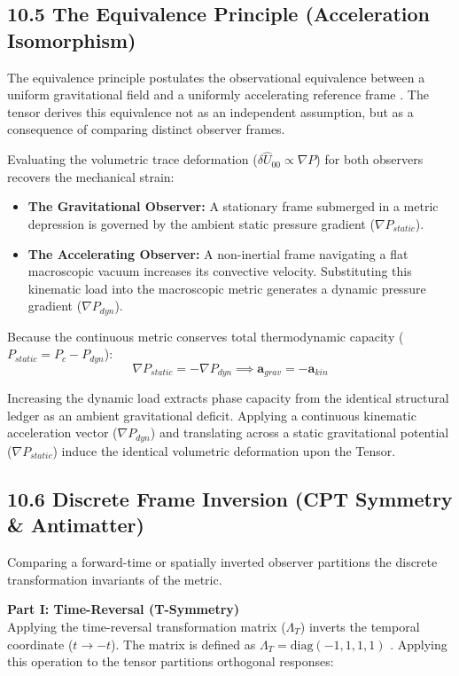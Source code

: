 \subsection*{10.5 The Equivalence Principle (Acceleration Isomorphism)}
The equivalence principle postulates the observational equivalence between a uniform gravitational field and a uniformly accelerating reference frame \cite{Einstein1907}. The tensor derives this equivalence not as an independent assumption, but as a consequence of comparing distinct observer frames.

Evaluating the volumetric trace deformation ($\delta \hat{U}_{00} \propto \nabla P$) for both observers recovers the mechanical strain: 
\begin{itemize}
    \item \textbf{The Gravitational Observer:} A stationary frame submerged in a metric depression is governed by the ambient static pressure gradient ($\nabla P_{static}$).
    \item \textbf{The Accelerating Observer:} A non-inertial frame navigating a flat macroscopic vacuum increases its convective velocity. Substituting this kinematic load into the macroscopic metric generates a dynamic pressure gradient ($\nabla P_{dyn}$).
\end{itemize}

Because the continuous metric conserves total thermodynamic capacity ($P_{static} = P_c - P_{dyn}$): 
\begin{equation}
    \nabla P_{static} = - \nabla P_{dyn} \implies \mathbf{a}_{grav} = -\mathbf{a}_{kin} \label{eq:equivalence_gradients}
\end{equation}

Increasing the dynamic load extracts phase capacity from the identical structural ledger as an ambient gravitational deficit. Applying a continuous kinematic acceleration vector ($\nabla P_{dyn}$) and translating across a static gravitational potential ($\nabla P_{static}$) induce the identical volumetric deformation upon the Tensor.

\subsection*{10.6 Discrete Frame Inversion (CPT Symmetry \& Antimatter)} 
Comparing a forward-time or spatially inverted observer partitions the discrete transformation invariants of the metric. 

\textbf{Part I: Time-Reversal (T-Symmetry)} \\ 
Applying the time-reversal transformation matrix ($\Lambda_T$) inverts the temporal coordinate ($t \to -t$). The matrix is defined as $\Lambda_T = \text{diag}(-1, 1, 1, 1)$ \cite{Weinberg1995}. Applying this operation to the tensor partitions orthogonal responses:

